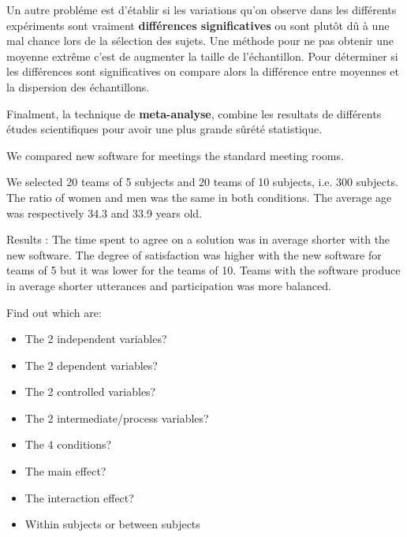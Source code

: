 \begin{itemize}
Un autre probl\'eme est d'\'etablir si les variations qu'on observe dans les diff\'erents exp\'eriments sont vraiment \textbf{diff\'erences significatives} ou sont plut\^ot d\^u \`a une mal chance lors de la s\'election des sujets. Une m\'ethode pour ne pas obtenir une moyenne extr\^eme c'est de augmenter la taille de l'\'echantillon. Pour d\'eterminer si les diff\'erences sont significatives on compare alors la diff\'erence entre moyennes et la dispersion des \'echantillons.

Finalment, la technique de \textbf{meta-analyse}, combine les resultats de diff\'erents \'etudes scientifiques  pour avoir une plus grande s\^ur\'et\'e statistique.
\end{itemize}

\begin{exercise}
We compared new software for meetings the standard meeting rooms.

We selected 20 teams of 5 subjects and 20 teams of 10 subjects, i.e. 300 subjects. The ratio of women and men was the same in both conditions. The average age was respectively 34.3 and 33.9 years old.

Results : The time spent to agree on a solution was in average shorter with the new software. The degree of satisfaction was higher with the new software for teams of 5 but it was lower for the teams of 10. Teams
with the software produce in average shorter utterances and  participation was more balanced.

Find out which are:

\begin{itemize}
\item The 2 independent variables?
\item The 2 dependent variables?
\item The 2 controlled variables?
\item The 2 intermediate/process variables?
\item The 4 conditions?
\item The main effect?
\item The interaction effect?
\item Within subjects or between subjects
\end{itemize}
\end{exercise}

